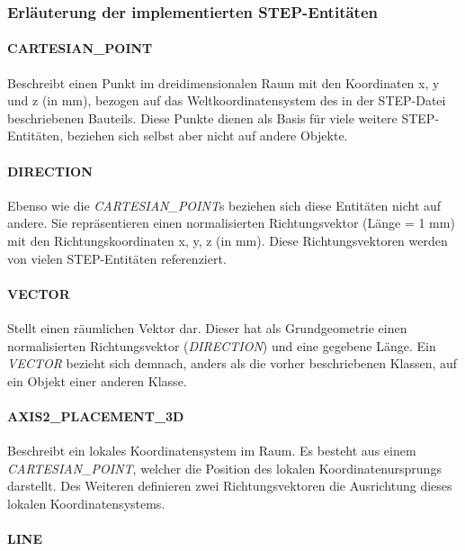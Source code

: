 \subsubsection{Erläuterung der implementierten STEP-Entitäten}
\label{sec:erklaerungstp}


\paragraph{CARTESIAN\_POINT}

Beschreibt einen Punkt im dreidimensionalen Raum mit den Koordinaten x, y und z (in mm), bezogen auf das Weltkoordinatensystem des in der STEP-Datei beschriebenen Bauteils. Diese Punkte dienen als Basis für viele weitere STEP-Entitäten, beziehen sich selbst aber nicht auf andere Objekte. 

\paragraph{DIRECTION}

Ebenso wie die \textit{CARTESIAN\_POINT}s beziehen sich diese Entitäten nicht auf andere. Sie repräsentieren einen normalisierten Richtungsvektor (Länge = 1 mm) mit den Richtungskoordinaten x, y, z (in mm). Diese Richtungsvektoren werden von vielen STEP-Entitäten referenziert.

\paragraph{VECTOR}

Stellt einen räumlichen Vektor dar. Dieser hat als Grundgeometrie einen normalisierten Richtungsvektor (\textit{DIRECTION}) und eine gegebene Länge. Ein \textit{VECTOR} bezieht sich demnach, anders als die vorher beschriebenen Klassen, auf ein Objekt einer anderen Klasse.

\paragraph{AXIS2\_PLACEMENT\_3D}

Beschreibt ein lokales Koordinatensystem im Raum. Es besteht aus einem \textit{CARTESIAN\_POINT}, welcher die Position des lokalen Koordinatenursprungs darstellt. Des Weiteren definieren zwei Richtungsvektoren die Ausrichtung dieses lokalen Koordinatensystems.

\paragraph{LINE}

